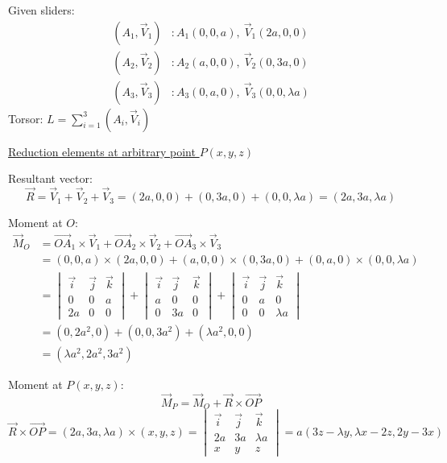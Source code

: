 \documentclass[12pt]{article}
\begin{document}
\begin{correctionbox}
Given sliders:
\begin{align*}
(A_1, \vec{V}_1) & : A_1(0,0,a), \ \vec{V}_1(2a,0,0) \\
(A_2, \vec{V}_2) & : A_2(a,0,0), \ \vec{V}_2(0,3a,0) \\
(A_3, \vec{V}_3) & : A_3(0,a,0), \ \vec{V}_3(0,0,\lambda a)
\end{align*}
Torsor: $L = \sum_{i=1}^3 (A_i, \vec{V}_i)$

\underline{Reduction elements at arbitrary point $P(x,y,z)$}

Resultant vector:
\[
\vec{R} = \vec{V}_1 + \vec{V}_2 + \vec{V}_3 = (2a, 0, 0) + (0, 3a, 0) + (0, 0, \lambda a) = (2a, 3a, \lambda a)
\]

Moment at $O$:
\begin{align*}
\vec{M}_O &= \vec{OA}_1 \times \vec{V}_1 + \vec{OA}_2 \times \vec{V}_2 + \vec{OA}_3 \times \vec{V}_3 \\
&= (0,0,a) \times (2a,0,0) + (a,0,0) \times (0,3a,0) + (0,a,0) \times (0,0,\lambda a) \\
&= 
\begin{vmatrix}
\vec{i} & \vec{j} & \vec{k} \\
0 & 0 & a \\
2a & 0 & 0
\end{vmatrix}
+ 
\begin{vmatrix}
\vec{i} & \vec{j} & \vec{k} \\
a & 0 & 0 \\
0 & 3a & 0
\end{vmatrix}
+ 
\begin{vmatrix}
\vec{i} & \vec{j} & \vec{k} \\
0 & a & 0 \\
0 & 0 & \lambda a
\end{vmatrix} \\
&= (0, 2a^2, 0) + (0, 0, 3a^2) + (\lambda a^2, 0, 0) \\
&= (\lambda a^2, 2a^2, 3a^2)
\end{align*}

Moment at $P(x,y,z)$:
\[
\vec{M}_P = \vec{M}_O + \vec{R} \times \vec{OP}
\]
\[
\vec{R} \times \vec{OP} = (2a, 3a, \lambda a) \times (x,y,z) = 
\begin{vmatrix}
\vec{i} & \vec{j} & \vec{k} \\
2a & 3a & \lambda a \\
x & y & z
\end{vmatrix}
= a(3z - \lambda y, \lambda x - 2z, 2y - 3x)
\]


\end{correctionbox}
\end{document}
